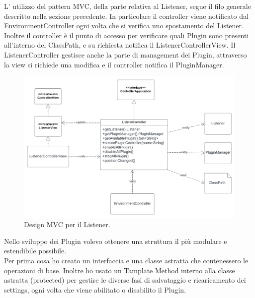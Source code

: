 \documentclass[a4paper,12pt]{report}
\begin{document}
%
L' utilizzo del pattern MVC, della parte relativa al Listener, segue il filo generale descritto nella sezione precedente. In particolare il controller viene notificato
dal EnvironmentController ogni volta che si verifica uno spostamento del Listener. Inoltre il controller è il punto di accesso per verificare quali Plugin sono presenti all'interno del ClassPath, e su richiesta notifica il ListenerControllerView. Il ListenerController gestisce anche la parte di management dei Plugin, attraverso la view si richiede una modifica e il controller notifica il PluginManager.

\begin{figure}[H]
\centering{}
\includegraphics[width=\textwidth]{img/listener/ListenerMVC.png}
\caption{Design MVC per il Listener.}
\label{img:Listener}
\end{figure}
%
Nello sviluppo dei Plugin volevo ottenere una struttura il più modulare e estendibile possibile.\\Per prima cosa ho creato un interfaccia e una classe astratta che contenessero le operazioni di base. Inoltre ho usato un Tamplate Method interno alla classe astratta (protected) per gestire le diverse fasi di salvataggio e ricaricamento dei settings, ogni volta che viene abilitato o disabilito il Plugin.
\end{document}
